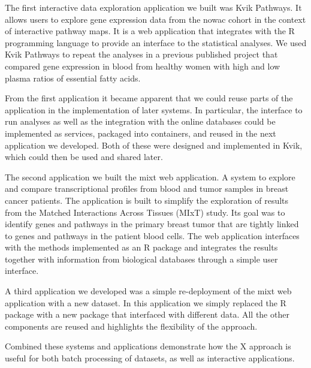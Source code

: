 The first interactive data exploration application we built was Kvik Pathways.
It allows users to explore gene expression data from the \gls{nowac} cohort in
the context of interactive pathway maps.\cite{pathways} It is a web application
that integrates with the R programming language to provide an interface to the
statistical analyses. We used Kvik Pathways to repeat the analyses in a previous
published project that compared gene expression in blood from healthy women with
high and low plasma ratios of essential fatty acids.\cite{olsen2013plasma}

From the first application it became apparent that we could reuse parts of the
application in the implementation of later systems. In particular, the interface
to run analyses as well as the integration with the online databases could be
implemented as services, packaged into containers, and reused in the next
application we developed. Both of these were designed and implemented in Kvik,
which could then be used and shared later. 

The second application we built the \gls{mixt} web application. A system to
explore and compare transcriptional profiles from blood and tumor samples in
breast cancer patients. The application is built to simplify the exploration of
results from the Matched Interactions Across Tissues (MIxT) study. Its goal was
to identify genes and pathways in the primary breast tumor that are tightly
linked to genes and pathways in the patient blood
cells.\cite{dumeaux2017interactions} The web application interfaces with the
methods implemented as an R package and integrates the results together with
information from biological databases through a simple user interface. 

A third application we developed was a simple re-deployment of the \gls{mixt}
web application with a new dataset. In this application we simply replaced the R
package with a new package that interfaced with different data. All the other
components are reused and highlights the flexibility of the approach. 

Combined these systems and applications demonstrate how the X approach is useful
for both batch processing of datasets, as well as interactive applications. 



